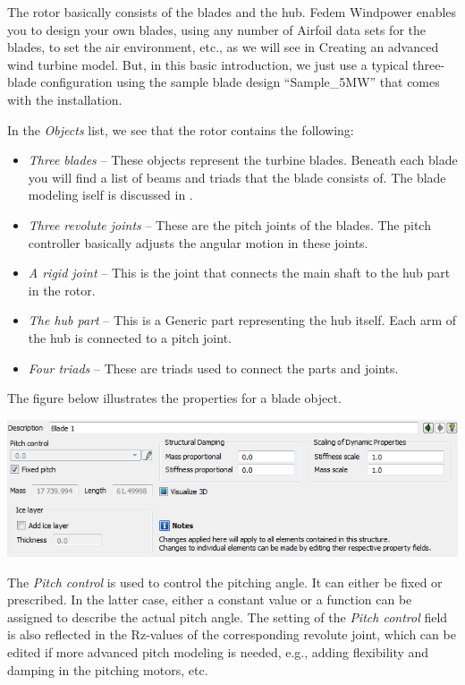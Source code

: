 
The rotor basically consists of the blades and the hub. Fedem Windpower
enables you to design your own blades, using any number of Airfoil data
sets for the blades, to set the air environment, etc., as we will see in
           {Creating an advanced wind turbine model}.
But, in this basic introduction, we just use a typical three-blade
configuration using the sample blade design ``Sample\_5MW''
that comes with the installation.

In the {\sl Objects} list, we see that the rotor contains the following:

\begin{itemize}
\item{\sl Three blades} --
  These objects represent the turbine blades.
  Beneath each blade you will find a list of beams and triads that the
  blade consists of. The blade modeling iself is discussed in
  .
\item{\sl Three revolute joints} --
  These are the pitch joints of the blades.
  The pitch controller basically adjusts the angular motion in these joints.
\item{\sl A rigid joint} --
  This is the joint that connects the main shaft to the hub part in the rotor.
\item{\sl The hub part} --
  This is a Generic part representing the hub itself.
  Each arm of the hub is connected to a pitch joint.
\item{\sl Four triads} --
  These are triads used to connect the parts and joints.
\end{itemize}

The figure below illustrates the properties for a blade object.

\noindent\includegraphics[width=\textwidth]{Figures/3b-Blade-Prop}

The {\sl Pitch control} is used to control the pitching angle.
It can either be fixed or prescribed. In the latter case, either a constant
value or a function can be assigned to describe the actual pitch angle.
The setting of the {\sl Pitch control} field is also reflected in the Rz-values
of the corresponding revolute joint, which can be edited if more advanced pitch
modeling is needed, e.g., adding flexibility and damping in the pitching motors,
etc.

